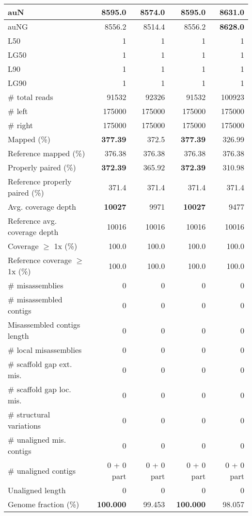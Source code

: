 \documentclass[12pt,a4paper]{article}
\begin{document}
\begin{table}[ht]
\begin{center}
\begin{tabular}{|l*{4}{|r}|}
auN & 8595.0 & 8574.0 & 8595.0 & {\bf 8631.0} \\ \hline
auNG & 8556.2 & 8514.4 & 8556.2 & {\bf 8628.0} \\ \hline
L50 & 1 & 1 & 1 & 1 \\ \hline
LG50 & 1 & 1 & 1 & 1 \\ \hline
L90 & 1 & 1 & 1 & 1 \\ \hline
LG90 & 1 & 1 & 1 & 1 \\ \hline
\# total reads & 91532 & 92326 & 91532 & 100923 \\ \hline
\# left & 175000 & 175000 & 175000 & 175000 \\ \hline
\# right & 175000 & 175000 & 175000 & 175000 \\ \hline
Mapped (\%) & {\bf 377.39} & 372.5 & {\bf 377.39} & 326.99 \\ \hline
Reference mapped (\%) & 376.38 & 376.38 & 376.38 & 376.38 \\ \hline
Properly paired (\%) & {\bf 372.39} & 365.92 & {\bf 372.39} & 310.98 \\ \hline
Reference properly paired (\%) & 371.4 & 371.4 & 371.4 & 371.4 \\ \hline
Avg. coverage depth & {\bf 10027} & 9971 & {\bf 10027} & 9477 \\ \hline
Reference avg. coverage depth & 10016 & 10016 & 10016 & 10016 \\ \hline
Coverage $\geq$ 1x (\%) & 100.0 & 100.0 & 100.0 & 100.0 \\ \hline
Reference coverage $\geq$ 1x (\%) & 100.0 & 100.0 & 100.0 & 100.0 \\ \hline
\# misassemblies & 0 & 0 & 0 & 0 \\ \hline
\# misassembled contigs & 0 & 0 & 0 & 0 \\ \hline
Misassembled contigs length & 0 & 0 & 0 & 0 \\ \hline
\# local misassemblies & 0 & 0 & 0 & 0 \\ \hline
\# scaffold gap ext. mis. & 0 & 0 & 0 & 0 \\ \hline
\# scaffold gap loc. mis. & 0 & 0 & 0 & 0 \\ \hline
\# structural variations & 0 & 0 & 0 & 0 \\ \hline
\# unaligned mis. contigs & 0 & 0 & 0 & 0 \\ \hline
\# unaligned contigs & 0 + 0 part & 0 + 0 part & 0 + 0 part & 0 + 0 part \\ \hline
Unaligned length & 0 & 0 & 0 & 0 \\ \hline
Genome fraction (\%) & {\bf 100.000} & 99.453 & {\bf 100.000} & 98.057 \\ \hline

\end{tabular}
\end{center}
\end{table}
\end{document}
